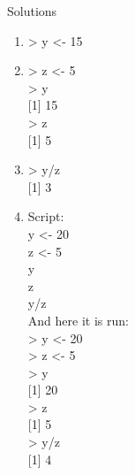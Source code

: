 \documentclass[
]{book}
\begin{document}
Solutions

\begin{enumerate}
\def\labelenumi{\arabic{enumi}.}
\item
  \textgreater{} y \textless- 15
\item
  \textgreater{} z \textless- 5\\
  \textgreater{} y\\
  {[}1{]} 15\\
  \textgreater{} z\\
  {[}1{]} 5
\item
  \textgreater{} y/z\\
  {[}1{]} 3
\item
  Script:\\
  y \textless- 20\\
  z \textless- 5\\
  y\\
  z\\
  y/z\\
  And here it is run:\\
  \textgreater{} y \textless- 20\\
  \textgreater{} z \textless- 5\\
  \textgreater{} y\\
  {[}1{]} 20\\
  \textgreater{} z\\
  {[}1{]} 5\\
  \textgreater{} y/z\\
  {[}1{]} 4
\end{enumerate}

  
\end{document}
